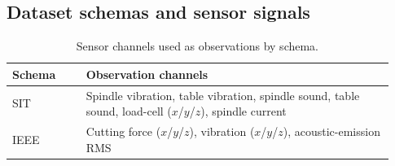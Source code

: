 \documentclass[sn-basic]{sn-jnl} %
\begin{document}
\begin{appendices}
\section{Dataset schemas and sensor signals}
\label{app:schema}
\begin{table}[htbp]
\centering
\caption{Sensor channels used as observations by schema.}
\label{tab:schema_features}
\begin{tabular}{p{0.18\linewidth} p{0.75\linewidth}}
\toprule
\textbf{Schema} & \textbf{Observation channels}\\
\midrule
SIT & Spindle vibration, table vibration, spindle sound, table sound, load-cell ($x$/$y$/$z$), spindle current\\
IEEE & Cutting force ($x$/$y$/$z$), vibration ($x$/$y$/$z$), acoustic-emission RMS\\
\bottomrule
\end{tabular}
\end{table}

\end{appendices}


\end{document}
